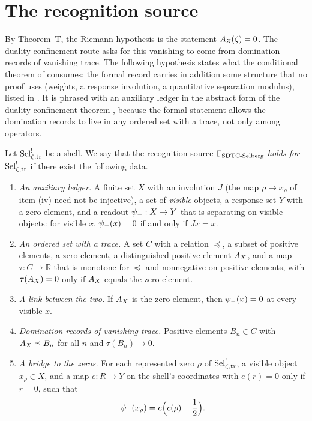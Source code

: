 \section{The recognition source}
\label{sec:recognition_source}

By Theorem~T, the Riemann hypothesis is the statement \(A_{Z}(\zeta)=0\).  The
duality-confinement route asks for this vanishing to come from
domination records of vanishing trace.  The following hypothesis
states what the conditional theorem of 
consumes; the formal record carries in addition some structure that no
proof uses (weights, a response involution, a quantitative separation
modulus), listed in .  It is phrased with an auxiliary
ledger in the abstract form of the duality-confinement theorem
\citep[Remark~7.2]{TsiokosSDTC2026}, because the formal statement
allows the domination records to live in any ordered set with a trace,
not only among operators.

\begin{obligation}
\label{obl:rh:gamma-sdtc-selberg}
Let \(\mathrm{Sel}^{!}_{\zeta,\mathrm{tr}}\) be a shell.  We say that the recognition source
\(\Gamma_{\mathrm{SDTC\text{-}Selberg}}\) \emph{holds for} \(\mathrm{Sel}^{!}_{\zeta,\mathrm{tr}}\) if there exist the
following data.
\begin{enumerate}[label=\textup{(\roman*)}]
  \item \emph{An auxiliary ledger.}  A finite set \(X\) with an involution \(J\) (the map
    \(\rho\mapsto x_\rho\) of item (iv) need not be injective), a set of \emph{visible} objects, a response set
    \(Y\) with a zero element, and a readout
    \(\psi_{-}:X\to Y\) that is separating on visible objects:
    for visible \(x\), \(\psi_{-}(x)=0\) if and only if \(Jx=x\).
  \item \emph{An ordered set with a trace.}  A set \(C\) with a
    relation \(\preceq\), a subset of positive elements, a zero element,
    a distinguished positive element \(A_{X}\), and a map
    \(\tau:C\to\mathbb R\) that is monotone for \(\preceq\) and
    nonnegative on positive elements, with \(\tau(A_{X})=0\) only if
    \(A_{X}\) equals the zero element.
  \item[(ii\('\))] \emph{A link between the two.}  If \(A_{X}\) is the zero
    element, then \(\psi_{-}(x)=0\) at every visible \(x\).
  \item \emph{Domination records of vanishing trace.}  Positive
    elements \(B_n\in C\) with \(A_{X}\preceq B_n\) for all \(n\) and
    \(\tau(B_n)\to0\).
  \item \emph{A bridge to the zeros.}  For each represented zero
    \(\rho\) of \(\mathrm{Sel}^{!}_{\zeta,\mathrm{tr}}\), a visible object \(x_\rho\in X\), and a map
    \(e:R\to Y\) on the shell's coordinates with \(e(r)=0\) only if
    \(r=0\), such that
    \[
      \psi_{-}(x_\rho)=e\Bigl(c(\rho)-\frac12\Bigr).
    \]
\end{enumerate}
\end{obligation}

